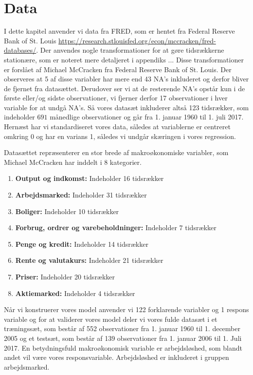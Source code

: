 \section{Data}
I dette kapitel anvender vi data fra FRED, som er hentet fra Federal Reserve Bank of St. Louis \url{https://research.stlouisfed.org/econ/mccracken/fred-databases/}.
Der anvendes nogle transformationer for at gøre tidsrækkerne stationære, som er noteret mere detaljeret i appendiks ... 
Disse transformationer er forslået af Michael McCracken fra Federal Reserve Bank of St. Louis.  
Der observeres at 5 af disse variabler har mere end 43 NA's inkluderet og derfor bliver de fjernet fra datasættet. 
Derudover ser vi at de resterende NA's opstår kun i de første eller/og sidste observationer, vi fjerner derfor 17 observationer i hver variable for at undgå NA's. 
Så vores datasæt inkluderer altså 123 tidsrækker, som indeholder $691$ månedlige observationer og går fra 1. januar 1960 til 1. juli 2017. 
Hernæst har vi standardiseret vores data, således at variablerne er centreret omkring 0 og har en varians 1, således vi undgår skæringen i vores regression. 

Datasættet repræsenterer en stor brede af makroøkonomiske variabler, som Michael McCracken har inddelt i 8 kategorier. 
\begin{enumerate}
\item \textbf{Output og indkomst:} Indeholder 16 tidsrækker
\item \textbf{Arbejdsmarked:}  Indeholder 31 tidsrækker
\item \textbf{Boliger:} Indeholder 10 tidsrækker
\item \textbf{Forbrug, ordrer og varebeholdninger:} Indeholder 7 tidsrækker
\item \textbf{Penge og kredit:} Indeholder 14 tidsrækker
\item\textbf{ Rente og valutakurs:} Indeholder 21 tidsrækker
\item \textbf{Priser:} Indeholder 20 tidsrækker
\item \textbf{Aktiemarked:} Indeholder 4 tidsrækker
\end{enumerate}

Når vi konstruerer vores model anvender vi 122 forklarende variabler og 1 respons variable og for at validerer vores model deler vi vores fulde datasæt i et træningssæt, som består af 552 observationer fra 1. januar 1960 til 1. december 2005 og et testsæt, som består af 139 observationer fra 1. januar 2006 til 1. Juli 2017. 
En betydningsfuld makroøkonomisk variable er arbejdsløshed, som blandt andet vil være vores responsvariable.  Arbejdsløshed er inkluderet i gruppen arbejdsmarked. 

